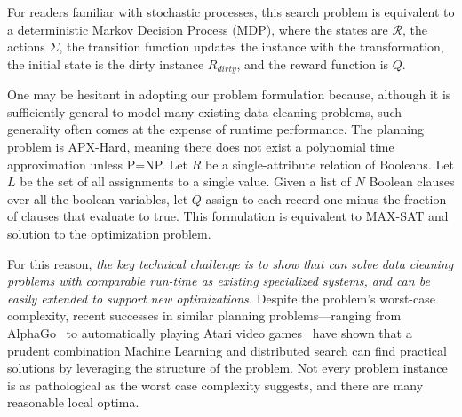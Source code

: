 For readers familiar with stochastic processes, this search problem is equivalent to a deterministic Markov Decision Process (MDP), where the states are $\mathcal{R}$, the actions $\Sigma$, the transition function updates the instance with the transformation, the initial state is the dirty instance $R_{dirty}$, and the reward function is $Q$.

One may be hesitant in adopting our problem formulation because, although it is sufficiently general to model many existing data cleaning problems, such generality often comes at the expense of runtime performance.   The planning problem is APX-Hard, meaning there does not exist a polynomial time approximation unless P=NP.  
Let $R$ be a single-attribute relation of Booleans. Let $L$ be the set of all assignments to a single value.
Given a list of $N$ Boolean clauses over all the boolean variables, let $Q$ assign to each record one minus the fraction of clauses that evaluate to true. This formulation is equivalent to MAX-SAT and solution to the optimization problem. 

For this reason, {\it the key technical challenge is to show that \sys can solve data cleaning problems with comparable run-time as existing specialized systems, and can be easily extended to support new optimizations.}
Despite the problem's worst-case complexity, 
recent successes in similar planning problems---ranging from AlphaGo~\cite{silver2016mastering} to automatically playing Atari video games~\cite{mnih2015human} have shown that a prudent combination Machine Learning and distributed search can find practical solutions by leveraging the structure of the problem. 
Not every problem instance is as pathological as the worst case complexity suggests, and there are many reasonable local optima.


